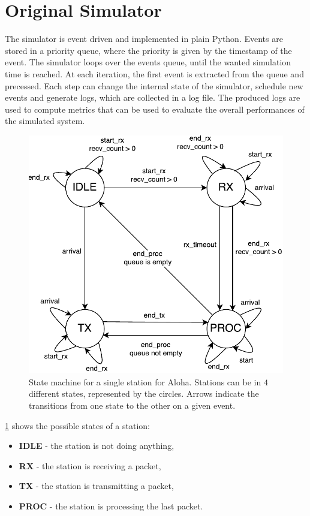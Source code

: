 \section{Original Simulator}
\label{sec:simulator_aloha}

The simulator is event driven and implemented in plain Python.
Events are stored in a priority queue, where the priority is given by the timestamp of the event.
The simulator loops over the events queue, until the wanted simulation time is reached.
At each iteration, the first event is extracted from the queue and precessed.
Each step can change the internal state of the simulator, schedule new events and generate logs, which are collected in a log file.
The produced logs are used to compute metrics that can be used to evaluate the overall performances of the simulated system.

\begin{figure}[h]
	\centering
	\includegraphics[width=0.88\columnwidth]{figures/states/aloha}
	\caption{State machine for a single station for Aloha. Stations can be in $4$ different states, represented by the circles. Arrows indicate the transitions from one state to the other on a given event.}
	\label{fig:aloha_states}
\end{figure}

\cref{fig:aloha_states} shows the possible states of a station:

\begin{itemize}
    \item \textbf{IDLE} - the station is not doing anything,
    \item \textbf{RX} - the station is receiving a packet,
    \item \textbf{TX} - the station is transmitting a packet,
    \item \textbf{PROC} - the station is processing the last packet.
\end{itemize}

